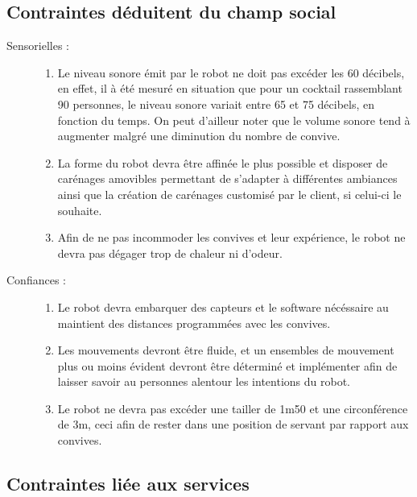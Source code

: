 \subsection{Contraintes déduitent du champ social}

\begin{description}
\item[Sensorielles :]
  \begin{enumerate}
  \item Le niveau sonore émit par le robot ne doit pas excéder les 60
    décibels, en effet, il à été mesuré en situation que pour un
    cocktail rassemblant 90 personnes, le niveau sonore variait entre
    65 et 75 décibels, en fonction du temps. On peut d'ailleur noter
    que le volume sonore tend à augmenter malgré une diminution du
    nombre de convive.
  \item La forme du robot devra être affinée le plus possible et
    disposer de carénages amovibles permettant de s'adapter à
    différentes ambiances ainsi que la création de carénages customisé
    par le client, si celui-ci le souhaite.
  \item Afin de ne pas incommoder les convives et leur expérience, le
    robot ne devra pas dégager trop de chaleur ni d'odeur.
  \end{enumerate}
\item[Confiances :]
  \begin{enumerate}
  \item Le robot devra embarquer des capteurs et le software
    nécéssaire au maintient des distances programmées avec les
    convives.
  \item Les mouvements devront être fluide, et un ensembles de
    mouvement plus ou moins évident devront être déterminé et
    implémenter afin de laisser savoir au personnes alentour les
    intentions du robot.
  \item Le robot ne devra pas excéder une tailler de 1m50 et une
    circonférence de 3m, ceci afin de rester dans une position de
    servant par rapport aux convives.
  \end{enumerate}
\end{description}


\subsection{Contraintes liée aux services}

